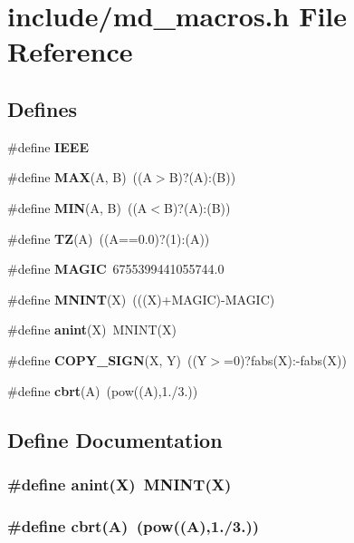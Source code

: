 \section{include/md\_\-macros.h File Reference}
\label{md__macros_8h}
\subsection*{Defines}
\begin{CompactItemize}
\item 
\#define {\bf IEEE}
\item 
\#define {\bf MAX}(A, B)~((A$>$B)?(A):(B))
\item 
\#define {\bf MIN}(A, B)~((A$<$B)?(A):(B))
\item 
\#define {\bf TZ}(A)~((A==0.0)?(1):(A))
\item 
\#define {\bf MAGIC}~6755399441055744.0
\item 
\#define {\bf MNINT}(X)~(((X)+MAGIC)-MAGIC)
\item 
\#define {\bf anint}(X)~MNINT(X)
\item 
\#define {\bf COPY\_\-SIGN}(X, Y)~((Y$>$=0)?fabs(X):-fabs(X))
\item 
\#define {\bf cbrt}(A)~(pow((A),1./3.))
\end{CompactItemize}


\subsection{Define Documentation}
\subsubsection{\setlength{\rightskip}{0pt plus 5cm}\#define anint(X)~MNINT(X)}\label{md__macros_8h_8b080d6ca17f9849549f62ac8fa16d75}


\subsubsection{\setlength{\rightskip}{0pt plus 5cm}\#define cbrt(A)~(pow((A),1./3.))}\label{md__macros_8h_9470bb91cd8ad02a9ae82499bfdf21f6}


